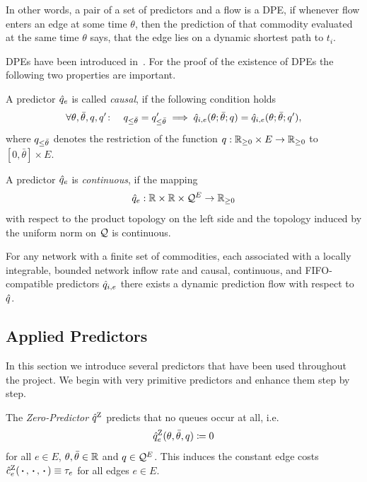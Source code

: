 In other words, a pair of a set of predictors and a flow is a DPE, if whenever flow enters an edge at some time $\theta$, then the prediction of that commodity evaluated at the same time $\theta$ says, that the edge lies on a dynamic shortest path to $t_i$.

DPEs have been introduced in~\cite{mainpaper}.
For the proof of the existence of DPEs the following two properties are important.

\begin{definition}
    A predictor $\hat q_{e}$  is called \emph{causal},
if the following condition holds
    \[
    \forall \theta,\bar\theta, q,q'\colon\quad
    q_{\leq \bar\theta} = q'_{\leq \bar\theta}
    \implies
    \hat q_{i,e}(\theta;\bar\theta;q)=\hat q_{i,e}(\theta;\bar\theta;q'),
    \]
    where $q_{\leq \bar\theta}$ denotes the restriction of the function $q: \mathbb{R}_{\geq 0} \times E \to \mathbb{R}_{\geq 0}$ to $[0,\bar\theta] \times E$.
\end{definition}
\begin{definition}
    A predictor $\hat q_{e}$ is \emph{continuous}, if the mapping 
    \[
        \hat q_{e}: \mathbb{R}\times \mathbb{R}\times \mathcal{Q}^E \rightarrow \mathbb{R}_{\geq0}
    \] with respect to the product topology on the left side and the topology induced by the uniform norm on $\mathcal{Q}$ is continuous.
\end{definition}

\begin{theorem}\label{thm:dpe-existence}
    For any network with a finite set of commodities, each associated with a locally integrable, bounded network inflow rate and causal, continuous, and FIFO-compatible predictors $\hat q_{i,e}$ there exists a dynamic prediction flow with respect to $\hat q$. 
\end{theorem}

\subsection{Applied Predictors}\label{sec:applied-predictors}

In this section we introduce several predictors that have been used throughout the project.
We begin with very primitive predictors and enhance them step by step.


The \emph{Zero-Predictor} $\hat q^{\text{Z}}$ predicts that no queues occur at all, i.e.\[
    \hat q^{\text{Z}}_{e}(\theta, \bar\theta, q) \coloneqq 0
\]
for all $e\in E$, $\theta,\bar\theta\in\mathbb{R}$ and $q\in \mathcal{Q}^E$.
This induces the constant edge costs $\hat c^{\text{Z}}_e(\,\boldsymbol{\cdot}\,, \,\boldsymbol{\cdot}\,, \,\boldsymbol{\cdot}\,)\equiv \tau_e$ for all edges $e\in E$.


